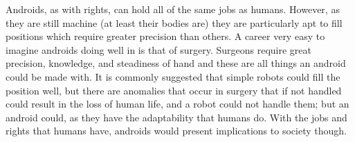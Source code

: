 Androids, as with rights, can hold all of the same jobs as humans. However, as they are still machine (at least their bodies are) they are particularly apt to fill positions which require greater precision than others. A career very easy to imagine androids doing well in is that of surgery. Surgeons require great precision, knowledge, and steadiness of hand and these are all things an android could be made with. It is commonly suggested that simple robots could fill the position well, but there are anomalies that occur in surgery that if not handled could result in the loss of human life, and a robot could not handle them; but an android could, as they have the adaptability that humans do. With the jobs and rights that humans have, androids would present implications to society though.